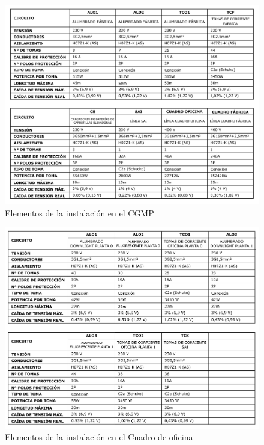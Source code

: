 \begin{figure}[!htb]
\centering
\includegraphics[width=1\textwidth]{Memoria/cuad1.png}
\caption{Elementos de la instalación en el CGMP}
\label{fig:digraph}
\end{figure}

\pagebreak

\begin{figure}[!htb]
\centering
\includegraphics[width=1\textwidth]{Memoria/cuad2.png}
\caption{Elementos de la instalación en el Cuadro de oficina}
\label{fig:digraph}
\end{figure}

\pagebreak

